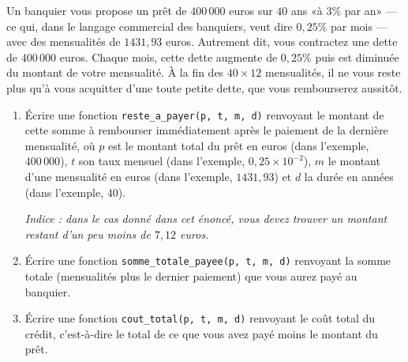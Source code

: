 \exer{}
\setcounter{numques}{0}

\question Un banquier vous  propose un prêt de $400\,000$ euros  sur $40$ ans «à
$3\%$ par  an» ---  ce qui, dans  le langage commercial  des banquiers,
veut  dire $0,25\%$  par mois  ---  avec des  mensualités de  $1431,93$
euros.  Autrement  dit,  vous   contractez  une  dette  de  $400\,000$
euros. Chaque mois, cette dette  augmente de $0,25\%$ puis est diminuée
du  montant  de  votre  mensualité.  À  la  fin  des  $40  \times  12$
mensualités, il  ne vous  reste plus qu'à  vous acquitter  d'une toute
petite dette, que vous rembourserez aussitôt.
\begin{enumerate}[label=\emph{\alph*)}]
  \item Écrire  une fonction  \texttt{reste\_a\_payer(p, t,  m, d)}
renvoyant  le montant  de cette  somme à  rembourser  immédiatement
après le paiement de la dernière
mensualité, où  $p$ est le  montant total du  prêt en euros (dans l'exemple, $400\,000$), $t$ son  taux mensuel (dans l'exemple, 
$0,25 \times 10^{-2}$), $m$ le montant d'une mensualité en euros (dans l'exemple, $1431,93$) et $d$ la
durée en années (dans l'exemple, $40$).

\emph{Indice : dans le cas donné dans cet énoncé, vous devez trouver un montant
restant d'un peu moins de $7,12$ euros.}
  \item Écrire une fonction \texttt{somme\_totale\_payee(p, t, m,
  d)} renvoyant la somme totale (mensualités plus le dernier
paiement) que vous aurez payé au banquier.
  \item Écrire une fonction \texttt{cout\_total(p, t, m, d)} renvoyant
  le coût total  du crédit, c'est-à-dire le total de  ce que vous avez
  payé moins le montant du prêt.
\end{enumerate}